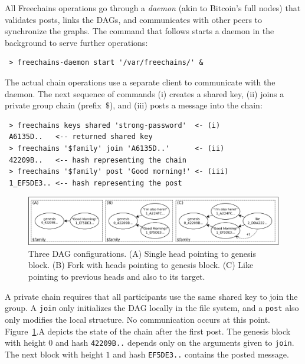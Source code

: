 \documentclass[10pt,journal,compsoc]{IEEEtran}
\newcommand{\FC}       {Freechains\xspace}
\newcommand{\code}[1]  {\texttt{\footnotesize{#1}}}
\begin{document}
All \FC operations go through a \emph{daemon} (akin to Bitcoin's full nodes)
that validates posts, links the DAGs, and communicates with other peers to
synchronize the graphs.
The command that follows starts a daemon in the background to serve further
operations:

{\footnotesize
\begin{verbatim}
 > freechains-daemon start '/var/freechains/' &
\end{verbatim}
}

The actual chain operations use a separate client to communicate with the
daemon.
The next sequence of commands (i) creates a shared key, (ii) joins a private
group chain (prefix~$\$$), and (iii) posts a message into the chain:

{\footnotesize
\begin{verbatim}
 > freechains keys shared 'strong-password'  <- (i)
 A6135D..   <-- returned shared key
 > freechains '$family' join 'A6135D..'      <- (ii)
 42209B..   <-- hash representing the chain
 > freechains '$family' post 'Good morning!' <- (iii)
 1_EF5DE3.. <-- hash representing the post
\end{verbatim}
}

\begin{figure}
\centering
\includegraphics[width=\textwidth]{family.png}
\caption{
    Three DAG configurations.
    (A) Single head pointing to genesis block.
    (B) Fork with heads pointing to genesis block.
    (C) Like pointing to previous heads and also to its target.
}
\label{fig.family}
\end{figure}

A private chain requires that all participants use the same shared key to join
the group.
A \code{join} only initializes the DAG locally in the file system, and a
\code{post} also only modifies the local structure.
No communication occurs at this point.
Figure~\ref{fig.family}.A depicts the state of the chain after the first post.
The genesis block with height $0$ and hash \code{42209B..}
depends only on the arguments given to \code{join}.
The next block with height $1$ and hash \code{EF5DE3..} contains the posted
message.
\end{document}
